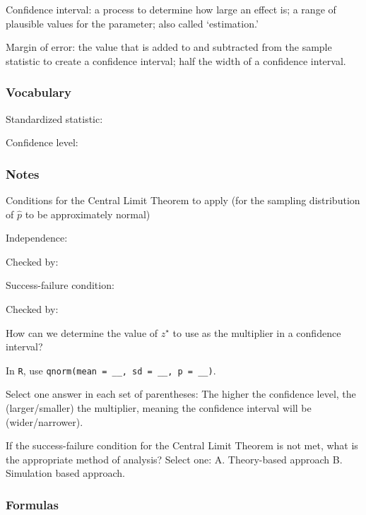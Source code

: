 \documentclass[
]{report}
\newcommand{\rgs}{\vspace{12pt}} %
\newcommand{\rgi}{\hspace{24pt}}  %
\begin{document}
Confidence interval: a process to determine how large an effect is; a range of plausible values for the parameter; also called `estimation.'

Margin of error: the value that is added to and subtracted from the sample statistic to create a confidence interval; half the width of a confidence interval.

\hypertarget{vocabulary-14}{%
\subsubsection*{Vocabulary}\label{vocabulary-14}}

Standardized statistic:
\rgs

Confidence level:
\rgs

\hypertarget{notes-18}{%
\subsubsection*{Notes}\label{notes-18}}

Conditions for the Central Limit Theorem to apply (for the sampling distribution of \(\hat{p}\) to be approximately normal)

\rgi Independence:
\rgs

\rgi \rgi Checked by:
\rgs

\rgi Success-failure condition:
\rgs

\rgi \rgi Checked by:
\rgs

How can we determine the value of \(z^⋆\) to use as the multiplier in a confidence interval?
\rgs

\rgi In \texttt{R}, use \texttt{qnorm(mean\ =\ \_\_,\ sd\ =\ \_\_,\ p\ =\ \_\_)}.

Select one answer in each set of parentheses: The higher the confidence level, the (larger/smaller) the multiplier, meaning the confidence interval will be (wider/narrower).

If the success-failure condition for the Central Limit Theorem is not met, what is the appropriate method of analysis? Select one:
\rgi A. Theory-based approach
\rgi B. Simulation based approach.

\hypertarget{formulas-2}{%
\subsubsection*{Formulas}\label{formulas-2}}
\end{document}
